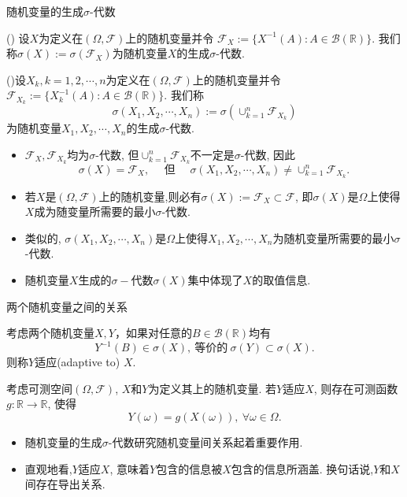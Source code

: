 \documentclass[Prob-All.tex]{subfiles}
\begin{document}
\begin{frame}{随机变量的生成$\sigma$-代数}
	\begin{defi}
	() 设$X$为定义在$(\Omega,\mathcal{F})$上的随机变量并令
	$\mathcal{F}_X:=\{X^{-1}(A):A\in \mathcal{B}(\mathbb{R})\}$. 我们称$\sigma(X):=\sigma\left(\mathcal{F}_{X}\right)$为随机变量$X$的生成$\sigma$-代数.
	\end{defi}
	\pause

\begin{defi}
  ()设$X_k, k=1,2,\cdots, n$为定义在$(\Omega,\mathcal{F})$上的随机变量并令
  $\mathcal{F}_{X_k}:=\{X_k^{-1}(A):A\in \mathcal{B}(\mathbb{R})\}$. 我们称\[\sigma(X_1,X_2,\cdots,X_n):=\sigma\left(\cup_{k=1}^n\mathcal{F}_{X_k}\right)\]为随机变量$X_1,X_2,\cdots,X_n$的生成$\sigma$-代数.
\end{defi}
\pause
\begin{itemize}[<+-|alert@+>]
	\item $\mathcal{F}_{X}, \mathcal{F}_{X_k}$均为$\sigma$-代数, 但$\cup_{k=1}^n\mathcal{F}_{X_k}$不一定是$\sigma$-代数, 因此
	\[\sigma(X)=\mathcal{F}_X, \quad \mbox{ 但  } \quad  \sigma(X_1,X_2,\cdots,X_n)\neq \cup_{k=1}^n\mathcal{F}_{X_k}.\]
	\item 若$X$是$(\Omega,\mathcal{F})$上的随机变量,则必有$\sigma(X):=\mathcal{F}_X\subset\mathcal{F}$, 即$\sigma(X)$是$\Omega$上使得$X$成为随变量所需要的最小$\sigma$-代数.
	\item 类似的, $\sigma(X_1,X_2,\cdots,X_n)$是$\Omega$上使得$X_1,X_2,\cdots,X_n$为随机变量所需要的最小$\sigma$-代数.
	\item 随机变量$X$生成的$\sigma-$代数$\sigma(X)$集中体现了$X$的取值信息.
\end{itemize}
\end{frame}
\begin{frame}{两个随机变量之间的关系}
\begin{defi}
考虑两个随机变量$X, Y$，如果对任意的$B\in\mathcal{B}(\mathbb{R})$均有
\[
Y^{-1}(B) \in \sigma(X),\ \mbox{等价的}\ \sigma(Y)\subset \sigma(X).
\]则称$Y$适应(adaptive to) $X$.
\end{defi}

\pause

\begin{thm}
考虑可测空间$(\Omega, \mathcal{F})$, $X$和$Y$为定义其上的随机变量. 若$Y$适应$X$, 则存在可测函数$g: \mathbb{R} \rightarrow \mathbb{R}$, 使得
\[
Y(\omega)=g(X(\omega)),  \ \forall \omega \in \Omega .
\]
\end{thm}
%
\pause
%
\begin{rmk}
	\begin{itemize}[<+-|alert@+>]
		\item 随机变量的生成$\sigma$-代数研究随机变量间关系起着重要作用.
		\item 直观地看,$Y$适应$X$, 意味着$Y$包含的信息被$X$包含的信息所涵盖. 换句话说,$Y$和$X$间存在导出关系.
	\end{itemize}
\end{rmk}



\end{frame}
\end{document}

